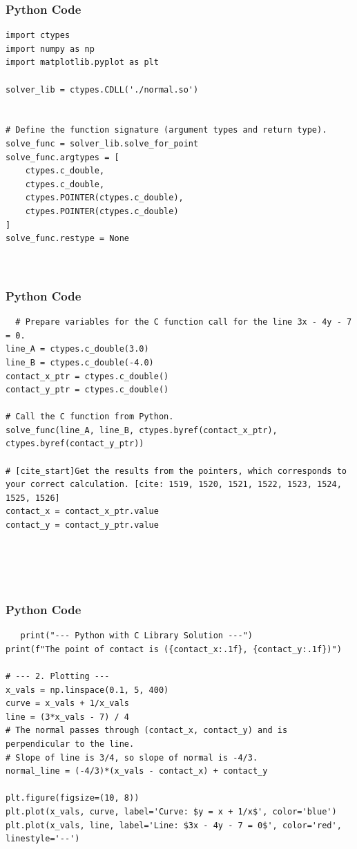 \documentclass{beamer}
\begin{document}
    \begin{frame}[fragile]
        \frametitle{Python Code}
        \begin{lstlisting}
import ctypes
import numpy as np
import matplotlib.pyplot as plt

solver_lib = ctypes.CDLL('./normal.so')


# Define the function signature (argument types and return type).
solve_func = solver_lib.solve_for_point
solve_func.argtypes = [
    ctypes.c_double, 
    ctypes.c_double,
    ctypes.POINTER(ctypes.c_double),
    ctypes.POINTER(ctypes.c_double)
]
solve_func.restype = None



        \end{lstlisting}
    \end{frame}
    
    \begin{frame}[fragile]
        \frametitle{Python Code}
        \begin{lstlisting}
  # Prepare variables for the C function call for the line 3x - 4y - 7 = 0.
line_A = ctypes.c_double(3.0)
line_B = ctypes.c_double(-4.0)
contact_x_ptr = ctypes.c_double()
contact_y_ptr = ctypes.c_double()

# Call the C function from Python.
solve_func(line_A, line_B, ctypes.byref(contact_x_ptr), ctypes.byref(contact_y_ptr))

# [cite_start]Get the results from the pointers, which corresponds to your correct calculation. [cite: 1519, 1520, 1521, 1522, 1523, 1524, 1525, 1526]
contact_x = contact_x_ptr.value
contact_y = contact_y_ptr.value



   
        \end{lstlisting}
    \end{frame}
    
    \begin{frame}[fragile]
        \frametitle{Python Code}
        \begin{lstlisting}
   print("--- Python with C Library Solution ---")
print(f"The point of contact is ({contact_x:.1f}, {contact_y:.1f})")

# --- 2. Plotting ---
x_vals = np.linspace(0.1, 5, 400)
curve = x_vals + 1/x_vals
line = (3*x_vals - 7) / 4
# The normal passes through (contact_x, contact_y) and is perpendicular to the line.
# Slope of line is 3/4, so slope of normal is -4/3.
normal_line = (-4/3)*(x_vals - contact_x) + contact_y

plt.figure(figsize=(10, 8))
plt.plot(x_vals, curve, label='Curve: $y = x + 1/x$', color='blue')
plt.plot(x_vals, line, label='Line: $3x - 4y - 7 = 0$', color='red', linestyle='--')

   
        \end{lstlisting}
    \end{frame}
    
\end{document}
